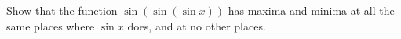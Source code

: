 Show that the function $\sin(\sin(\sin x))$ has maxima and minima at all the same places
where $\sin x$ does, and at no other places.

